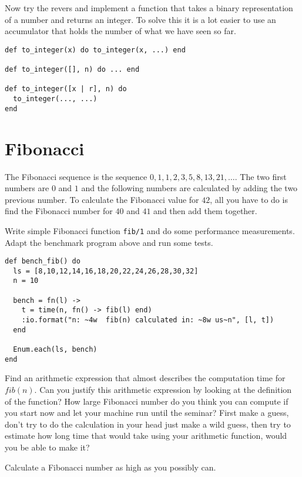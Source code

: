 \documentclass[a4paper,11pt]{article}
\begin{document}
Now try the revers and implement a function that takes a binary
representation of a number and returns an integer. To solve this it is
a lot easier to use an accumulator that holds the number of what we
have seen so far.

\begin{verbatim}
def to_integer(x) do to_integer(x, ...) end

def to_integer([], n) do ... end

def to_integer([x | r], n) do
  to_integer(..., ...)
end
\end{verbatim}



\section{Fibonacci}

The Fibonacci sequence is the sequence $0,1,1,2,3,5,8,13,21,
\ldots$. The two first numbers are $0$ and $1$ and the following
numbers are calculated by adding the two previous number. To calculate
the Fibonacci value for $42$, all you have to do is find the Fibonacci
number for $40$ and $41$ and then add them together.

Write simple Fibonacci function {\tt fib/1} and do some performance
measurements. Adapt the benchmark program above and run some tests.

\begin{verbatim}
def bench_fib() do
  ls = [8,10,12,14,16,18,20,22,24,26,28,30,32]
  n = 10
  
  bench = fn(l) ->
    t = time(n, fn() -> fib(l) end)
    :io.format("n: ~4w  fib(n) calculated in: ~8w us~n", [l, t])
  end
  
  Enum.each(ls, bench)
end
\end{verbatim}

Find an arithmetic expression that almost describes the computation
time for $fib(n)$. Can you justify this arithmetic expression by
looking at the definition of the function?  How large Fibonacci number
do you think you can compute if you start now and let your machine run
until the seminar? First make a guess, don't try to do the calculation
in your head just make a wild guess, then try to estimate how long
time that would take using your arithmetic function, would you be able
to make it? 

Calculate a Fibonacci number as high as you possibly can.
\end{document}
